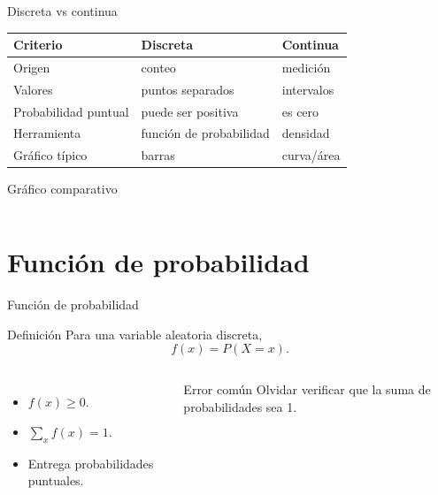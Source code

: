 \documentclass[aspectratio=169,11pt]{beamer}
\begin{document}
\begin{frame}{Discreta vs continua}
\small
\begin{center}
\begin{tabular}{p{}p{}p{}}
\toprule
Criterio & Discreta & Continua \\
\midrule
Origen & conteo & medición \\
Valores & puntos separados & intervalos \\
Probabilidad puntual & puede ser positiva & es cero \\
Herramienta & función de probabilidad & densidad \\
Gráfico típico & barras & curva/área \\
\bottomrule
\end{tabular}
\end{center}
\end{frame}

\begin{frame}{Gráfico comparativo}
\begin{columns}[T]
\centering
{}
\centering
{}
\end{columns}
\end{frame}

\section{Función de probabilidad}

\begin{frame}{Función de probabilidad}
\begin{block}{Definición}
Para una variable aleatoria discreta,
\[
f(x)=P(X=x).
\]
\end{block}
\begin{columns}[T]
\begin{itemize}
  \item $f(x)\ge0$.
  \item $\sum_x f(x)=1$.
  \item Entrega probabilidades puntuales.
\end{itemize}
\begin{alertblock}{Error común}
Olvidar verificar que la suma de probabilidades sea 1.
\end{alertblock}
\end{columns}
\end{frame}
\end{document}
